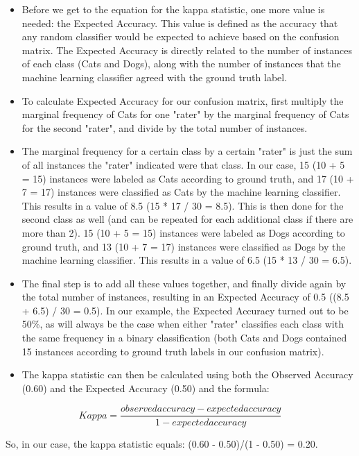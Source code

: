 \documentclass[caret-main.tex]{subfiles}
\begin{document}
\begin{itemize}
\item Before we get to the equation for the kappa statistic, one more value is needed: the Expected Accuracy. This value is defined as the accuracy that any random classifier would be expected to achieve based on the confusion matrix. The Expected Accuracy is directly related to the number of instances of each class (Cats and Dogs), along with the number of instances that the machine learning classifier agreed with the ground truth label. 
\item To calculate Expected Accuracy for our confusion matrix, first multiply the marginal frequency of Cats for one "rater" by the marginal frequency of Cats for the second "rater", and divide by the total number of instances. \item The marginal frequency for a certain class by a certain "rater" is just the sum of all instances the "rater" indicated were that class. In our case, 15 (10 + 5 = 15) instances were labeled as Cats according to ground truth, and 17 (10 + 7 = 17) instances were classified as Cats by the machine learning classifier. This results in a value of 8.5 (15 * 17 / 30 = 8.5). This is then done for the second class as well (and can be repeated for each additional class if there are more than 2). 15 (10 + 5 = 15) instances were labeled as Dogs according to ground truth, and 13 (10 + 7 = 17) instances were classified as Dogs by the machine learning classifier. This results in a value of 6.5 (15 * 13 / 30 = 6.5). 
\item The final step is to add all these values together, and finally divide again by the total number of instances, resulting in an Expected Accuracy of 0.5 ((8.5 + 6.5) / 30 = 0.5). In our example, the Expected Accuracy turned out to be 50\%, as will always be the case when either "rater" classifies each class with the same frequency in a binary classification (both Cats and Dogs contained 15 instances according to ground truth labels in our confusion matrix).
\item 
The kappa statistic can then be calculated using both the Observed Accuracy (0.60) and the Expected Accuracy (0.50) and the formula:
\end{itemize}
\[Kappa = \frac{observed accuracy - expected accuracy}{1 - expected accuracy}\]


So, in our case, the kappa statistic equals: (0.60 - 0.50)/(1 - 0.50) = 0.20.
\end{document}
